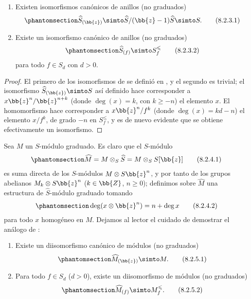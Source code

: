 \documentclass[oneside,10pt]{amsart}
\renewcommand{\leq}{\leqslant}
\renewcommand{\geq}{\geqslant}
\let\EGAOriginalLabel\label
\renewcommand{\label}[1]{\phantomsection\EGAOriginalLabel{#1}}
\begin{document}
\begin{lemma}[8.2.3]
\label{II.8.2.3}
\begin{enumerate}
  \item[\rm{(i)}] Existen isomorfismos canónicos de anillos (no graduados)
    \[
    \label{II.8.2.3.1}
      \widehat{S}_{(\bb{z})}
      \simto
      \widehat{S}/(\bb{z}-1)\widehat{S}
      \simto
      S.
    \tag{8.2.3.1}
    \]
  \item[\rm{(ii)}] Existe un isomorfismo canónico de anillos (no graduados)
    \[
    \label{II.8.2.3.2}
      \widehat{S}_{(f)} \simto S_f^\leq
    \tag{8.2.3.2}
    \]
    para todo $f\in S_d$ con $d>0$.
\end{enumerate}
\end{lemma}

\begin{proof}
El primero de los isomorfismos de  se definió en , y el segundo es trivial;
el isomorfismo $\widehat{S}_{(\bb{z})}\simto S$ así definido hace corresponder a $x\bb{z}^n/\bb{z}^{n+k}$ (donde $\deg(x)=k$, con $k\geq-n$) el elemento $x$.
El homomorfismo  hace corresponder a $x\bb{z}^n/f^k$ (donde $\deg(x)=kd-n$) el elemento $x/f^k$, de grado $-n$ en $S_f^\leq$, y es de nuevo evidente que se obtiene efectivamente un isomorfismo.
\end{proof}

\begin{env}[8.2.4]
\label{II.8.2.4}
Sea $M$ un $S$-módulo graduado.
Es claro que el $S$-módulo
\[
\label{II.8.2.4.1}
  \widehat{M}=M\otimes_S\widehat{S}=M\otimes_SS[\bb{z}]
\tag{8.2.4.1}
\]
es suma directa de los $S$-módulos $M\otimes S\bb{z}^n$, y por tanto de los grupos abelianos $M_k\otimes S\bb{z}^n$ ($k\in\bb{Z}$, $n\geq0$);
definimos sobre $\widehat{M}$ una estructura de $\widehat{S}$-módulo graduado tomando
\[
\label{II.8.2.4.2}
  \deg(x\otimes\bb{z}^n)=n+\deg x
\tag{8.2.4.2}
\]
para todo $x$ homogéneo en $M$.
Dejamos al lector el cuidado de demostrar el análogo de :
\end{env}

\begin{lemma}[8.2.5]
\label{II.8.2.5}
\begin{enumerate}
  \item[\rm{(i)}] Existe un diisomorfismo canónico de módulos (no graduados)
    \[
    \label{II.8.2.5.1}
      \widehat{M}_{(\bb{z})} \simto M.
    \tag{8.2.5.1}
    \]
  \item[\rm{(ii)}] Para todo $f\in S_d$ ($d>0$), existe un diisomorfismo de módulos (no graduados)
    \[
    \label{II.8.2.5.2}
      \widehat{M}_{(f)} \simto M_f^\leq.
    \tag{8.2.5.2}
    \]
\end{enumerate}
\end{lemma}
\end{document}
